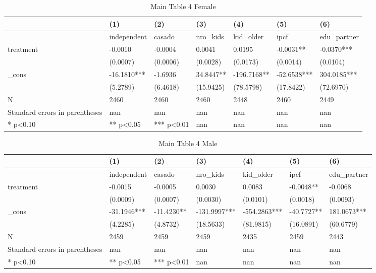 \documentclass[11pt]{article}
\begin{document}
\clearpage
\begin{table}[!htbp]
\centering
\caption{Main Table 4 Female}
\label{tab:table4_f}
\begin{tabular}{lllllll}
\toprule
 & (1) & (2) & (3) & (4) & (5) & (6) \\
\midrule
 & independent & casado & nro\_kids & kid\_older & ipcf & edu\_partner \\
treatment & -0.0010 & -0.0004 & 0.0041 & 0.0195 & -0.0031** & -0.0370*** \\
 & (0.0007) & (0.0006) & (0.0028) & (0.0173) & (0.0014) & (0.0104) \\
\_cons & -16.1810*** & -1.6936 & 34.8447** & -196.7168** & -52.6538*** & 304.0185*** \\
 & (5.2789) & (6.4618) & (15.9425) & (78.5798) & (17.8422) & (72.6970) \\
N & 2460 & 2460 & 2460 & 2448 & 2460 & 2449 \\
Standard errors in parentheses & nan & nan & nan & nan & nan & nan \\
* p<0.10 & ** p<0.05 & *** p<0.01 & nan & nan & nan & nan \\
\bottomrule
\end{tabular}

\end{table}

\clearpage
\begin{table}[!htbp]
\centering
\caption{Main Table 4 Male}
\label{tab:table4_m}
\begin{tabular}{lllllll}
\toprule
 & (1) & (2) & (3) & (4) & (5) & (6) \\
\midrule
 & independent & casado & nro\_kids & kid\_older & ipcf & edu\_partner \\
treatment & -0.0015 & -0.0005 & 0.0030 & 0.0083 & -0.0048** & -0.0068 \\
 & (0.0009) & (0.0007) & (0.0030) & (0.0101) & (0.0018) & (0.0093) \\
\_cons & -31.1946*** & -11.4230** & -131.9997*** & -554.2863*** & -40.7727** & 181.0673*** \\
 & (4.2285) & (4.8732) & (18.5633) & (81.9815) & (16.0891) & (60.6779) \\
N & 2459 & 2459 & 2459 & 2435 & 2459 & 2443 \\
Standard errors in parentheses & nan & nan & nan & nan & nan & nan \\
* p<0.10 & ** p<0.05 & *** p<0.01 & nan & nan & nan & nan \\
\bottomrule
\end{tabular}

\end{table}
\end{document}
